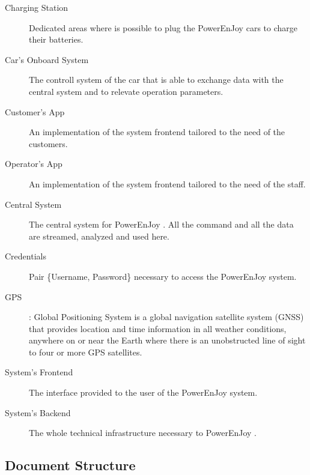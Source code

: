 \documentclass[11pt]{article} %
\newcommand{\pe}{PowerEnJoy }
\begin{document}
\begin{description}
	\item[Charging Station] Dedicated areas where is possible to plug the \pe cars to charge their batteries.
	\item[Car's Onboard System] The controll system of the car that is able to exchange data with the central system and to relevate operation parameters.
	\item[Customer's App] An implementation of the system frontend tailored to the need of the customers.
	\item[Operator's App] An implementation of the system frontend tailored to the need of the staff.
	\item[Central System] The central system for \pe. All the command and all the data are streamed, analyzed and used here.
	\item[Credentials] Pair \{Username, Password\} necessary to access the \pe system.
  	\item[GPS]: Global Positioning System is a global navigation satellite system (GNSS) that provides location and time information in all weather conditions, anywhere on or near the Earth where there is an unobstructed line of sight to four or more GPS satellites.
  	\item[System's Frontend] The interface provided to the user of the \pe system. 
  	\item[System's Backend]  The whole technical infrastructure necessary to \pe.
  \end{description}

\subsection{Document Structure}
\end{document}
